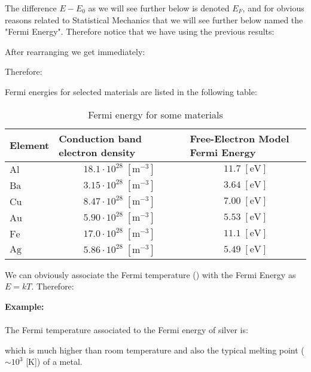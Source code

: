	The difference $E-E_0$ as we will see further below is denoted $E_F$, and for obvious reasons related to Statistical Mechanics that we will see further below named the "Fermi Energy". Therefore notice that we have using the previous results:
	
	After rearranging we get immediately:
	
	Therefore:
	
	Fermi energies for selected materials are listed in the following table:
	\begin{table}[H]
		\centering
		\begin{tabular}{|l|c|c|}
		\hline
		\rowcolor[HTML]{9B9B9B} 
		\textbf{Element} & \multicolumn{1}{l|}{\cellcolor[HTML]{9B9B9B}\textbf{Conduction band electron density}} & \multicolumn{1}{l|}{\cellcolor[HTML]{9B9B9B}\textbf{Free-Electron Model Fermi Energy}} \\ \hline
		$\mathrm{Al}$ & $18.1\cdot 10^{28}\;[\text{m}^{-3}]$ & $11.7\;[\text{eV}]$ \\ \hline
		$\mathrm{Ba}$ & $3.15\cdot 10^{28}\;[\text{m}^{-3}]$ & $3.64\;[\text{eV}]$ \\ \hline
		$\mathrm{Cu}$ & $8.47\cdot 10^{28}\;[\text{m}^{-3}]$ & $7.00\;[\text{eV}]$ \\ \hline
		$\mathrm{Au}$ & $5.90\cdot 10^{28}\;[\text{m}^{-3}]$ & $5.53\;[\text{eV}]$ \\ \hline
		$\mathrm{Fe}$ & $17.0\cdot 10^{28}\;[\text{m}^{-3}]$ & $11.1\;[\text{eV}]$ \\ \hline
		$\mathrm{Ag}$ & $5.86\cdot 10^{28}\;[\text{m}^{-3}]$ & $5.49\;[\text{eV}]$ \\ \hline
		\end{tabular}
		\caption{Fermi energy for some materials}
	\end{table}
	We can obviously associate the Fermi temperature () with the Fermi Energy as $E=kT$. Therefore:
	
	\begin{tcolorbox}[colframe=black,colback=white,sharp corners]
	\textbf{{\Large {}}Example:}\\\\
	The Fermi temperature associated to the Fermi energy of silver is:
	
	which is much higher than room temperature and also the typical melting point ($\sim 10^3$ [K]) of a metal.
	\end{tcolorbox}
	
